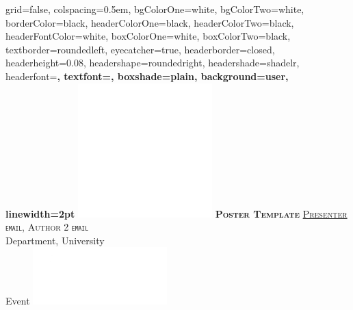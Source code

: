 \documentclass[final,paperwidth= 24in, paperheight= 36in ,fontscale=0.5]{baposter}
\begin{document}
\begin{poster}%
  {
  grid=false,
  colspacing=0.5em,
  bgColorOne=white,
  bgColorTwo=white,
  borderColor=black,
  headerColorOne=black,
  headerColorTwo=black,
  headerFontColor=white,
  boxColorOne=white,
  boxColorTwo=black,
  textborder=roundedleft,
  eyecatcher=true,
  headerborder=closed,
  headerheight=0.08\textheight,
  headershape=roundedright,
  headershade=shadelr,
  headerfont=\large\bf\textsc, %
  textfont={\setlength{\parindent}{1.5em}},
  boxshade=plain,
  background=user, 
  linewidth=2pt
  }
{\includegraphics[width=14em]{images/MathDepartment}
} 
{\bf\textsc{\color{white} Poster Template}
}
{\textsc{\color{white} 
\underline{\large Presenter} \texttt{\large email}, 
{\large Author 2} \texttt{\large email}
} 
\\ \normalsize{\color{white} Department, University}
\\ \normalsize{\color{white} Event}
}
{
\includegraphics[width=14em]{images/UNTEagle}
}




\end{poster}
\end{document}
